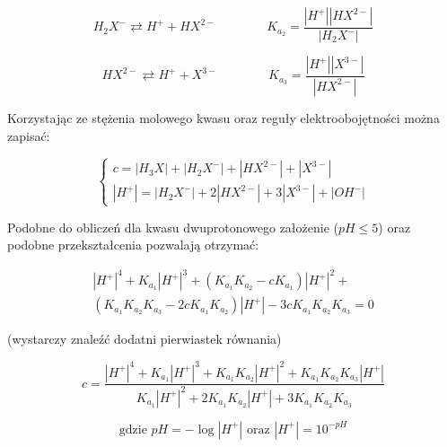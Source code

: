 \documentclass[polish,polish,a4paper,12pt]{article}
\begin{document}
\begin{enumerate}
				\begin{equation*}
					H_2X^- \rightleftarrows H^+ + HX^{2-} \hspace{4em} K_{a_2} = \frac{|H^+||HX^{2-}|}{|H_2X^-|}
				\end{equation*}
			
				\begin{equation*}
					HX^{2-} \rightleftarrows H^+ + X^{3-} \hspace{4em} K_{a_3} = \frac{|H^+||X^{3-}|}{|HX^{2-}|}
				\end{equation*}
			
				Korzystając ze stężenia molowego kwasu oraz reguły elektroobojętności można zapisać:
				
				\begin{equation*}
					\begin{cases}
						c = |H_3X| + |H_2X^-| + |HX^{2-}| + |X^{3-}|\\
						|H^+| =|H_2X^-| + 2|HX^{2-}| + 3|X^{3-}| + |OH^-|
					\end{cases}
				\end{equation*}
			
				Podobne do obliczeń dla kwasu dwuprotonowego założenie ($pH \leqslant 5$) oraz podobne przekształcenia pozwalają otrzymać:
				
				\begin{equation*}
					\begin{gathered}
					|H^+|^4 + K_{a_1}|H^+|^3 + \left(K_{a_1}K_{a_2} - cK_{a_1}\right)|H^+|^2 + \\
					\left(K_{a_1}K_{a_2}K_{a_3} - 2cK_{a_1}K_{a_2}\right)|H^+| - 3cK_{a_1}K_{a_2}K_{a_3} = 0
					\end{gathered}
				\end{equation*}
			
				\begin{center}
					(wystarczy znaleźć dodatni pierwiastek równania)
				\end{center}
			
				\begin{equation*}
					c = \frac{|H^+|^4 + K_{a_1}|H^+|^3 + K_{a_1}K_{a_2}|H^+|^2 + K_{a_1}K_{a_2}K_{a_3}|H^+|}{K_{a_1}|H^+|^2 + 2K_{a_1}K_{a_2}|H^+| + 3K_{a_1}K_{a_2}K_{a_3}}
				\end{equation*}
			
				\begin{equation*}
					\text{gdzie } pH = -\log |H^+| \text{ oraz } |H^+| = 10^{-pH}
				\end{equation*}
			\end{enumerate}
		
\end{document}

